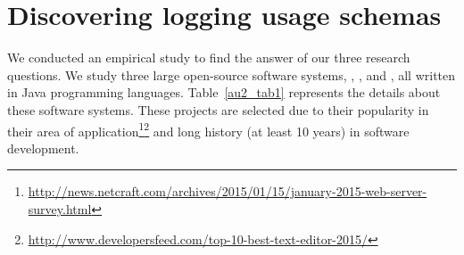\chapter{Discovering logging usage schemas}\label{discover}\label{eval}

We conducted an empirical study to find the answer of our three research questions. We study three large open-source software systems, , , and , all written in Java programming languages. Table~\ref{au2_tab1} represents the details about these software systems.
These projects are selected due to their popularity in their area of application\footnote{
\url{http://news.netcraft.com/archives/2015/01/15/january-2015-web-server-survey.html}}\footnote{\url{http://www.developersfeed.com/top-10-best-text-editor-2015/}} and long history (at least 10 years) in software development.

%
%
